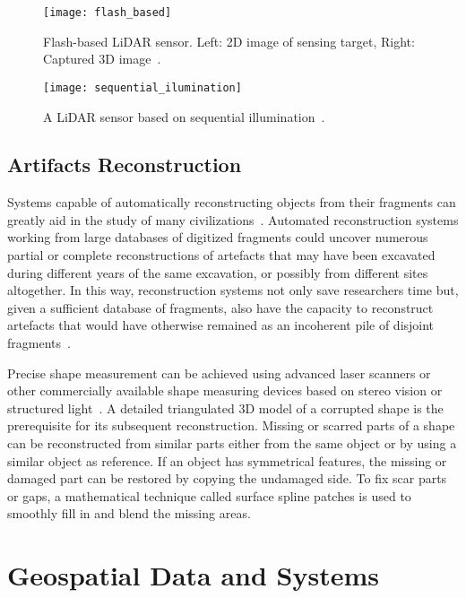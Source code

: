 \begin{figure}[h!]
    \centering
    \texttt{[image: flash\_based]}
    \caption{Flash-based \gls{LiDAR} sensor. \small{Left: \gls{2D} image of sensing target, Right: Captured \gls{3D} image}~\cite{li2022progress}.}
    \label{fig:flash_based}
\end{figure} 

\begin{figure}[h!]
    \centering
    \texttt{[image: sequential\_ilumination]}
    \caption{A \gls{LiDAR} sensor based on sequential illumination~\cite{li2022progress}.}
    \label{fig:sequential_ilumination}
\end{figure} 

\FloatBarrier

\subsection{Artifacts Reconstruction}
\label{sec:reconstruction}

Systems capable of automatically reconstructing objects from their fragments can greatly aid in the study of many civilizations~\cite{willis2008computational}.
Automated reconstruction systems working from large databases of digitized fragments could uncover numerous partial or
complete reconstructions of artefacts that may have been excavated during different years of the same excavation, or possibly
from different sites altogether. In this way, reconstruction systems not only save researchers time but, given a sufficient database 
of fragments, also have the capacity to reconstruct artefacts that would have otherwise remained as an incoherent pile of disjoint fragments~.

Precise shape measurement can be achieved using advanced laser scanners or other commercially available shape measuring devices based on stereo 
vision or structured light~\cite{7801178}. A detailed triangulated \gls{3D} model of a corrupted shape is the prerequisite for its subsequent reconstruction. 
Missing or scarred parts of a shape can be reconstructed from similar parts either from the same
object or by using a similar object as reference. If an object has symmetrical features, the missing or damaged part can be restored by copying the undamaged side.
To fix scar parts or gaps, a mathematical technique called surface spline patches is used to smoothly fill in and blend the missing areas.

\section{Geospatial Data and Systems}
\label{sec:geographic_information_system}

